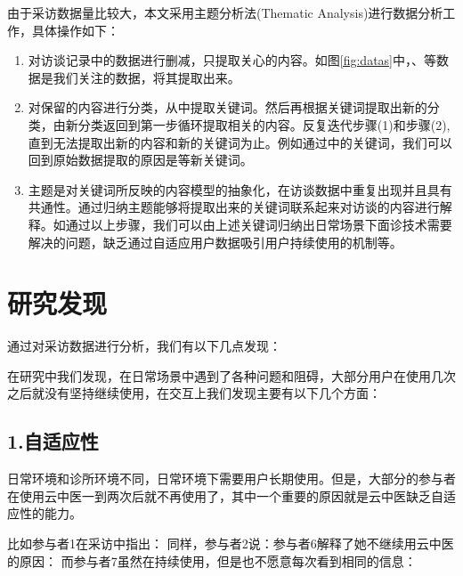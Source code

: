 由于采访数据量比较大，本文采用主题分析法(Thematic Analysis)进行数据分析工作，具体操作如下\cite{SchwandtQualitative}：



\begin{enumerate}

    \item 对访谈记录中的数据进行删减，只提取关心的内容。如图\ref{fig:datas}中，、等数据是我们关注的数据，将其提取出来。

    \item 对保留的内容进行分类，从中提取关键词。然后再根据关键词提取出新的分类，由新分类返回到第一步循环提取相关的内容。反复迭代步骤(1)和步骤(2), 直到无法提取出新的内容和新的关键词为止。例如通过中的关键词，我们可以回到原始数据提取的原因是等新关键词。

    \item 主题是对关键词所反映的内容模型的抽象化，在访谈数据中重复出现并且具有共通性。通过归纳主题能够将提取出来的关键词联系起来对访谈的内容进行解释。如通过以上步骤，我们可以由上述关键词归纳出日常场景下面诊技术需要解决的问题，缺乏通过自适应用户数据吸引用户持续使用的机制等。
\end{enumerate}

\section{研究发现}

通过对采访数据进行分析，我们有以下几点发现：


在研究中我们发现，在日常场景中遇到了各种问题和阻碍，大部分用户在使用几次之后就没有坚持继续使用，在交互上我们发现主要有以下几个方面：

\subsection{1.自适应性}

日常环境和诊所环境不同，日常环境下需要用户长期使用。但是，大部分的参与者在使用云中医一到两次后就不再使用了，其中一个重要的原因就是云中医缺乏自适应性的能力。

比如参与者1在采访中指出：
同样，参与者2说：参与者6解释了她不继续用云中医的原因：
而参与者7虽然在持续使用，但是也不愿意每次看到相同的信息：

